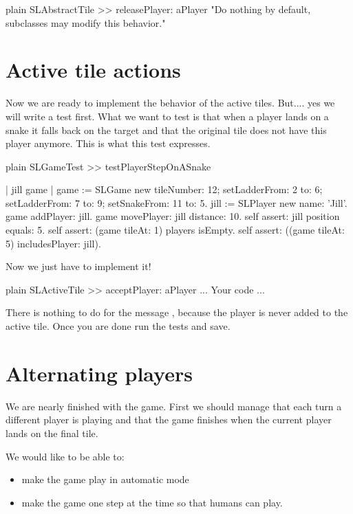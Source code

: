 \documentclass[10pt,twoside,english]{_support/latex/sbabook/sbabook}
\begin{document}
\begin{displaycode}{plain}
SLAbstractTile >> releasePlayer: aPlayer
	"Do nothing by default, subclasses may modify this behavior."
\end{displaycode}
\section{Active tile actions}
Now we are ready to implement the behavior of the active tiles. But.... yes we will write a test first.  What we want to test is that when a player lands on a snake it falls back on the target and that the original tile does not have this player anymore. This is what this test expresses.

\begin{displaycode}{plain}
SLGameTest >> testPlayerStepOnASnake
	
	| jill game |
	game := SLGame new
			tileNumber: 12;
			setLadderFrom: 2 to: 6;
			setLadderFrom: 7 to: 9;
			setSnakeFrom: 11 to: 5.
	jill := SLPlayer new name: 'Jill'.
	game addPlayer: jill.
	game movePlayer: jill distance: 10.
	self assert: jill position equals: 5.
	self assert: (game tileAt: 1) players isEmpty.
	self assert: ((game tileAt: 5) includesPlayer: jill).
\end{displaycode}

Now we just have to implement it!

\begin{displaycode}{plain}
SLActiveTile >> acceptPlayer: aPlayer
	... Your code ...
\end{displaycode}

There is nothing to do for the message , because the player is never added to the active tile. Once you are done run the tests and save.
\section{Alternating players}
We are nearly finished with the game. First we should manage that each turn a different player is playing and that the game finishes when the current player lands on the final tile. 

We would like to be able to: 

\begin{itemize}
\item make the game play in automatic mode
\item make the game one step at the time so that humans can play.
\end{itemize}
\end{document}
